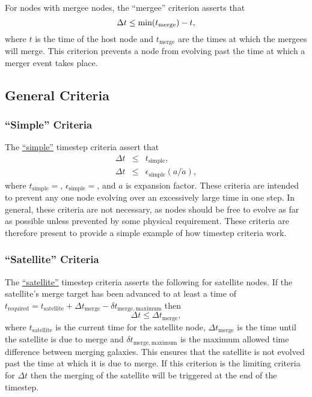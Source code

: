 For \glspl{node} with \gls{mergee} \glspl{node}, the ``\gls{mergee}'' criterion asserts that
\begin{equation}
 \Delta t \le \hbox{min}(t_\mathrm{merge}) - t,
\end{equation}
where $t$ is the time of the host \gls{node} and $t_\mathrm{merge}$ are the times at which the \glspl{mergee} will merge. This criterion prevents a \gls{node} from evolving past the time at which a merger event takes place.

\subsection{General Criteria}

\subsubsection{``Simple'' Criteria}

The \hyperlink{merger_trees.evolve.timesteps.simple.F90:merger_tree_timesteps_simple:merger_tree_timestep_simple}{``simple''} timestep criteria assert that
\begin{eqnarray}
\Delta t &\le& t_\mathrm{simple}, \\
\Delta t &\le& \epsilon_\mathrm{simple} (a/\dot{a}),
\end{eqnarray}
where $t_\mathrm{simple}=${\normalfont \ttfamily [timestepSimpleAbsolute]}, $\epsilon_\mathrm{simple}=${\normalfont \ttfamily [timestepSimpleRelative]}, and $a$ is expansion factor. These criteria are intended to prevent any one node evolving over an excessively large time in one step. In general, these criteria are not necessary, as nodes should be free to evolve as far as possible unless prevented by some physical requirement. These criteria are therefore present to provide a simple example of how timestep criteria work.

\subsubsection{``Satellite'' Criteria}

The \hyperlink{merger_trees.evolve.timesteps.satellite.F90:merger_tree_timesteps_satellite:merger_tree_timestep_satellite}{``satellite''} timestep criteria asserts the following for satellite \glspl{node}. If the satellite's merge target has been advanced to at least a time of $t_\mathrm{required} = t_\mathrm{satellite} + \Delta t_\mathrm{merge} - \delta t_\mathrm{merge,maximum}$ then 
\begin{equation}
\Delta t \le \Delta t_\mathrm{merge},
\end{equation}
where $t_\mathrm{satellite}$ is the current time for the satellite \gls{node}, $\Delta t_\mathrm{merge}$ is the time until the satellite is due to merge and $\delta t_\mathrm{merge,maximum}$ is the maximum allowed time difference between merging galaxies. This ensures that the satellite is not evolved past the time at which it is due to merge. If this criterion is the limiting criteria for $\Delta t$ then the merging of the satellite will be triggered at the end of the timestep.

